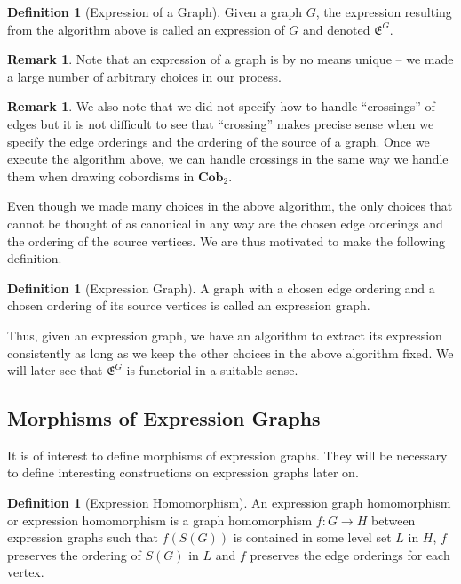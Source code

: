 \documentclass{amsart}
\renewcommand{\to}[1][]{\stackrel{#1}{\longrightarrow}}
\newcommand{\Cob}{\textbf{Cob}}
\newcommand{\Exp}[1]{\mathfrak{E}^{#1}}
\numberwithin{thm}{section}
\theoremstyle{definition}
\newtheorem{defn}[thm]{Definition}
\newtheorem{rmk}[thm]{Remark}
\begin{document}
\begin{defn}[Expression of a Graph]
Given a graph $G$, the expression resulting from the algorithm above is called
an expression of $G$ and denoted $\Exp{G}$.
\end{defn}

\begin{rmk}
Note that an expression of a graph is by no means unique -- we made a large
number of arbitrary choices in our process.
\end{rmk}

\begin{rmk} We also note that we did not specify how to handle ``crossings'' of
edges but it is not difficult to see that ``crossing'' makes precise sense when
we specify the edge orderings and the ordering of the source of a graph. Once we
execute the algorithm above, we can handle crossings in the same way we handle
them when drawing cobordisms in $\Cob_2$.
\end{rmk}

Even though we made many choices in the above algorithm, the only
choices that cannot be thought of as canonical in any way are the chosen edge
orderings and the ordering of the source vertices. We are thus motivated to make
the following definition.

\begin{defn}[Expression Graph]
A graph with a chosen edge ordering and a chosen ordering of its source vertices
is called an expression graph.
\end{defn}

Thus, given an expression graph, we have an algorithm to extract its expression
consistently as long as we keep the other choices in the above algorithm fixed.
We will later see that $\Exp{G}$ is functorial in a suitable sense.

%

\subsection{Morphisms of Expression Graphs}

It is of interest to define morphisms of expression graphs. They will be
necessary to define interesting constructions on expression graphs later on.

\begin{defn}[Expression Homomorphism]
An expression graph homomorphism or expression homomorphism is a graph
homomorphism $f : G \to H$ between expression graphs such that $f(S(G))$ is
contained in some level set $L$ in $H$, $f$ preserves the ordering of $S(G)$ in
$L$ and $f$ preserves the edge orderings for each vertex.
\end{defn}
\end{document}

